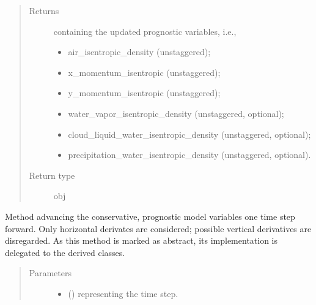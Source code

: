 \documentclass[letterpaper,10pt,english]{sphinxmanual}
\begin{document}
\begin{fulllineitems}
\begin{fulllineitems}
\begin{quote}
\begin{description}
\item[{Returns}] \leavevmode

{\hyperref[\detokenize{api:storages.state_isentropic.StateIsentropic}]{}} containing the updated prognostic variables, i.e.,
\begin{itemize}
\item {} 
air\_isentropic\_density (unstaggered);

\item {} 
x\_momentum\_isentropic (unstaggered);

\item {} 
y\_momentum\_isentropic (unstaggered);

\item {} 
water\_vapor\_isentropic\_density (unstaggered, optional);

\item {} 
cloud\_liquid\_water\_isentropic\_density (unstaggered, optional);

\item {} 
precipitation\_water\_isentropic\_density (unstaggered, optional).

\end{itemize}


\item[{Return type}] \leavevmode
obj

\end{description}\end{quote}

\end{fulllineitems}


\begin{fulllineitems}
\label{\detokenize{api:dycore.prognostic_isentropic.PrognosticIsentropic.step_neglecting_vertical_advection}}
Method advancing the conservative, prognostic model variables one time step forward.
Only horizontal derivates are considered; possible vertical derivatives are disregarded.
As this method is marked as abstract, its implementation is delegated to the derived classes.
\begin{quote}\begin{description}
\item[{Parameters}] \leavevmode\begin{itemize}
\item {} 
 () \textendash{}  representing the time step.


\end{itemize}
\end{description}
\end{quote}
\end{fulllineitems}
\end{fulllineitems}
\end{document}

